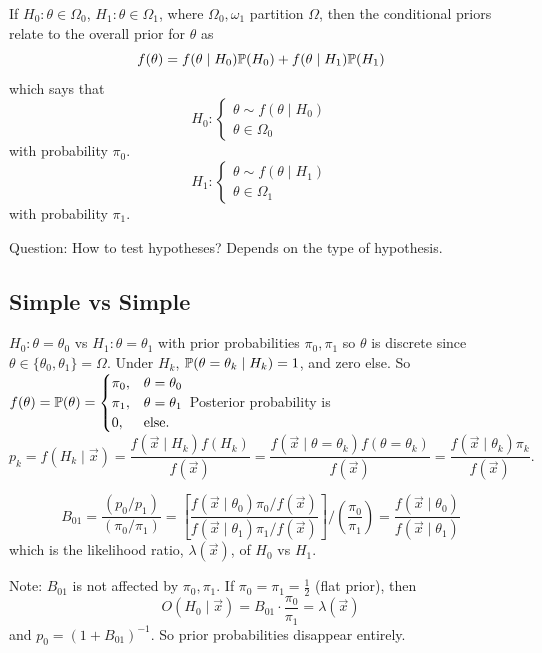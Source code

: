 \documentclass[10pt, a4paper]{article}
\begin{document}
If $H_0 : \theta \in \Omega_0$,
$H_1 : \theta \in \Omega_1$,
where $\Omega_0, \omega_1$ partition $\Omega$,
then the conditional priors relate to the overall prior for $\theta$ as
\[
f(\theta) = f(\theta \mid H_0)\P(H_0) + f(\theta \mid H_1)\P(H_1)
\]
which says that
\[
H_0 : \begin{cases}
    \theta \sim f(\theta \mid H_0) \\
    \theta \in \Omega_0
\end{cases}
\]
with probability $\pi_0$.
\[
H_1 : \begin{cases}
    \theta \sim f(\theta \mid H_1) \\
    \theta \in \Omega_1
\end{cases}
\]
with probability $\pi_1$.

Question:
How to test hypotheses?
Depends on the type of hypothesis.

\subsection{Simple vs Simple}
$H_0 : \theta = \theta_0$ vs $H_1 : \theta = \theta_1$ with prior probabilities $\pi_0, \pi_1$ so $\theta$ is discrete since $\theta \in \{\theta_0, \theta_1\} = \Omega$.
Under $H_k$,
$\P(\theta = \theta_k \mid H_k) = 1$,
and zero else.
So $f(\theta) = \P(\theta) = \begin{cases}
    \pi_0, &\theta = \theta_0 \\
    \pi_1, &\theta = \theta_1 \\
    0, &\text{else}.
\end{cases}$
Posterior probability is
\[
p_k = f(H_k \mid \vec{x}) = \frac{f(\vec{x} \mid H_k)f(H_k)}{f(\vec{x})} = \frac{f(\vec{x} \mid \theta = \theta_k)f(\theta = \theta_k)}{f(\vec{x})} = \frac{f(\vec{x} \mid \theta_k)\pi_k}{f(\vec{x})}.
\]

\begin{proposition}
    \[
    B_{01} = \frac{(p_0 / p_1)}{(\pi_0 / \pi_1)} = \left[\frac{f(\vec{x} \mid \theta_0)\pi_0 / f(\vec{x})}{f(\vec{x} \mid \theta_1)\pi_1 / f(\vec{x})}\right] \biggr/ \left(\frac{\pi_0}{\pi_1}\right) = \frac{f(\vec{x} \mid \theta_0)}{f(\vec{x} \mid \theta_1)}
    \]
    which is the likelihood ratio,
    $\lambda(\vec{x})$,
    of $H_0$ vs $H_1$.
\end{proposition}

Note:
$B_{01}$ is not affected by $\pi_0, \pi_1$.
If $\pi_0 = \pi_1 = \frac{1}{2}$
(flat prior),
then
\[
O(H_0 \mid \vec{x}) = B_{01} \cdot \frac{\pi_0}{\pi_1} = \lambda(\vec{x})
\]
and $p_0 = (1 + B_{01}) ^ {-1}$.
So prior probabilities disappear entirely.
\end{document}
